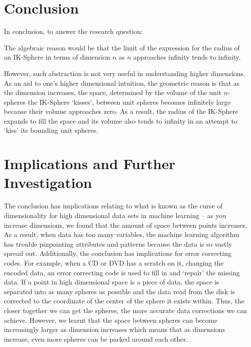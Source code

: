 \section{Conclusion}
In conclusion, to answer the research question:
\researchquestion{}

The algebraic reason would be that the limit of the expression for the radius of an IK-Sphere in terms of dimension $n$ as $n$ approaches infinity tends to infinity.

However, such abstraction is not very useful in understanding higher dimensions. As an aid to one's higher dimensional intuition, the geometric reason is that as the dimension increases, the space, determined by the volume of the unit $n$-spheres the IK-Sphere `kisses', between unit spheres becomes infinitely large because their volume approaches zero. As a result, the radius of the IK-Sphere expands to fill the space and its volume also tends to infinity in an attempt to `kiss' its bounding unit spheres. 

\section{Implications and Further Investigation} 
The conclusion has implications relating to what is known as the curse of dimensionality for high dimensional data sets in machine learning -- as you increase dimensions, we found that the amount of space between points increases. As a result, when data has too many variables, the machine learning algorithm has trouble pinpointing attributes and patterns because the data is so vastly spread out. Additionally, the conclusion has implications for error correcting codes. For example, when a CD or DVD has a scratch on it, changing the encoded data, an error correcting code is used to fill in and `repair' the missing data. If a point in high dimensional space is a piece of data, the space is separated into as many spheres as possible and the data read from the disk is corrected to the coordinate of the center of the sphere it exists within. Thus, the closer together we can get the spheres, the more accurate data corrections we can achieve. However, we learnt that the space between spheres can become increasingly larger as dimension increases which means that as dimensions increase, even more spheres can be packed around each other.